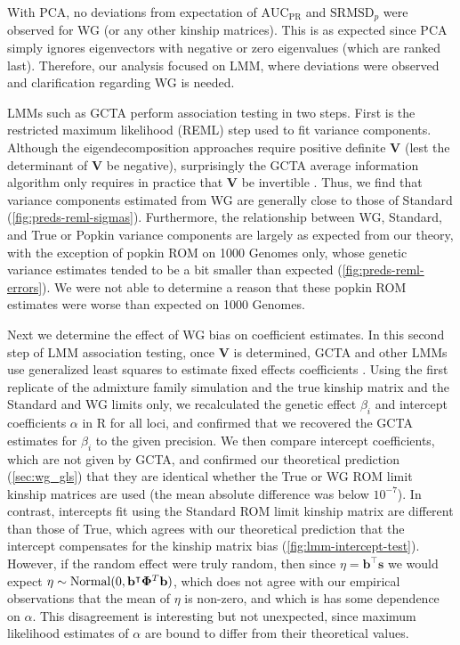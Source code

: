 \documentclass[11pt]{article}
\newcommand{\rmsd}{\text{SRMSD}_p}
\newcommand{\auc}{\text{AUC}_\text{PR}}
\newcommand{\kinMat}[1][T]{%
  \ensuremath{%
    \mathbf{\Phi}^{#1}
  }%
  \xspace%
}%
\begin{document}
With PCA, no deviations from expectation of $\auc$ and $\rmsd$ were observed for WG (or any other kinship matrices).
This is as expected since PCA simply ignores eigenvectors with negative or zero eigenvalues (which are ranked last).
Therefore, our analysis focused on LMM, where deviations were observed and clarification regarding WG is needed.

LMMs such as GCTA perform association testing in two steps.
First is the restricted maximum likelihood (REML) step used to fit variance components.
Although the eigendecomposition approaches \citep{kang_efficient_2008, lippert_fast_2011, svishcheva_rapid_2012, zhou_genome-wide_2012, sul_population_2018} require positive definite $\mathbf{V}$ (lest the determinant of $\mathbf{V}$ be negative), surprisingly the GCTA average information algorithm only requires in practice that $\mathbf{V}$ be invertible \citep{yang_gcta:_2011}.
Thus, we find that variance components estimated from WG are generally close to those of Standard (\cref{fig:preds-reml-sigmas}).
Furthermore, the relationship between WG, Standard, and True or Popkin variance components are largely as expected from our theory, with the exception of popkin ROM on 1000 Genomes only, whose genetic variance estimates tended to be a bit smaller than expected (\cref{fig:preds-reml-errors}).
We were not able to determine a reason that these popkin ROM estimates were worse than expected on 1000 Genomes.

Next we determine the effect of WG bias on coefficient estimates.
In this second step of LMM association testing, once $\mathbf{V}$ is determined, GCTA and other LMMs use generalized least squares to estimate fixed effects coefficients \citep{kang_efficient_2008, kang_variance_2010, yang_advantages_2014}.
Using the first replicate of the admixture family simulation and the true kinship matrix and the Standard and WG limits only, we recalculated the genetic effect $\beta_i$ and intercept coefficients $\alpha$ in R for all loci, and confirmed that we recovered the GCTA estimates for $\beta_i$ to the given precision.
We then compare intercept coefficients, which are not given by GCTA, and confirmed our theoretical prediction (\cref{sec:wg_gls}) that they are identical whether the True or WG ROM limit kinship matrices are used (the mean absolute difference was below $10^{-7}$).
In contrast, intercepts fit using the Standard ROM limit kinship matrix are different than those of True, which agrees with our theoretical prediction that the intercept compensates for the kinship matrix bias (\cref{fig:lmm-intercept-test}).
However, if the random effect were truly random, then since $\eta = \mathbf{b}^\intercal \mathbf{s}$ we would expect $\eta \sim \text{Normal}( 0, \mathbf{b}^\intercal \kinMat \mathbf{b})$, which does not agree with our empirical observations that the mean of $\eta$ is non-zero, and which is has some dependence on $\alpha$.
This disagreement is interesting but not unexpected, since maximum likelihood estimates of $\alpha$ are bound to differ from their theoretical values.
\end{document}
